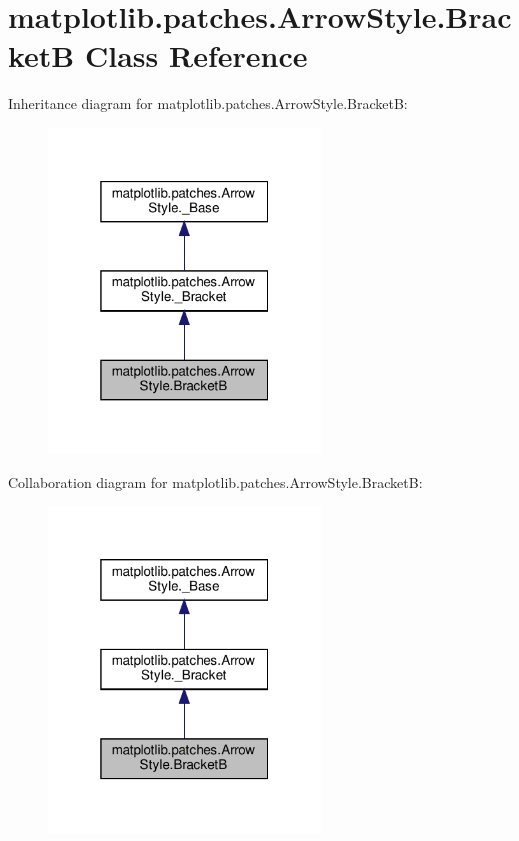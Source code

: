 \hypertarget{classmatplotlib_1_1patches_1_1ArrowStyle_1_1BracketB}{}\section{matplotlib.\+patches.\+Arrow\+Style.\+BracketB Class Reference}
\label{classmatplotlib_1_1patches_1_1ArrowStyle_1_1BracketB}


Inheritance diagram for matplotlib.\+patches.\+Arrow\+Style.\+BracketB\+:
\nopagebreak
\begin{figure}[H]
\begin{center}
\leavevmode
\includegraphics[width=205pt]{classmatplotlib_1_1patches_1_1ArrowStyle_1_1BracketB__inherit__graph}
\end{center}
\end{figure}


Collaboration diagram for matplotlib.\+patches.\+Arrow\+Style.\+BracketB\+:
\nopagebreak
\begin{figure}[H]
\begin{center}
\leavevmode
\includegraphics[width=205pt]{classmatplotlib_1_1patches_1_1ArrowStyle_1_1BracketB__coll__graph}
\end{center}
\end{figure}
